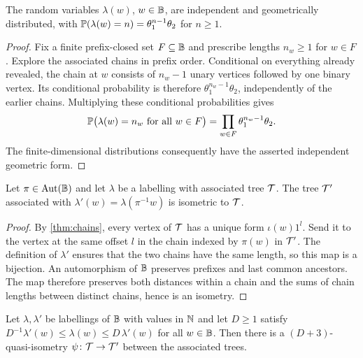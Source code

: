 \begin{lemma}
\label{thm:geometric}
\leanok
The random variables $\lambda(w)$, $w\in\mathbb{B}$, are independent and geometrically distributed,
with $\mathbb{P}(\lambda(w)=n)=\theta_1^{n-1}\theta_2$ for $n\geq1$.
\end{lemma}

\begin{proof}
\leanok
{}
Fix a finite prefix-closed set $F\subseteq\mathbb{B}$ and prescribe lengths $n_w\geq1$ for
$w\in F$. Explore the associated chains in prefix order. Conditional on everything already
revealed, the chain at $w$ consists of $n_w-1$ unary vertices followed by one binary vertex.
Its conditional probability is therefore $\theta_1^{n_w-1}\theta_2$, independently of the
earlier chains. Multiplying these conditional probabilities gives
\[
 \mathbb{P}\bigl(\lambda(w)=n_w\text{ for all }w\in F\bigr)
 =\prod_{w\in F}\theta_1^{n_w-1}\theta_2.
\]
The finite-dimensional distributions consequently have the asserted independent geometric
form.
\end{proof}

\begin{lemma}
\label{thm:isometry}
\leanok
Let $\pi\in\operatorname{Aut}(\mathbb{B})$ and let $\lambda$ be a labelling with associated tree $\mathcal{T}$. The tree
$\mathcal{T}'$ associated with $\lambda'(w)=\lambda(\pi^{-1}w)$ is isometric to $\mathcal{T}$.
\end{lemma}

\begin{proof}
\leanok
{}
By \cref{thm:chains}, every vertex of $\mathcal{T}$ has a unique form $\iota(w)1^l$. Send it to the
vertex at the same offset $l$ in the chain indexed by $\pi(w)$ in $\mathcal{T}'$. The definition of
$\lambda'$ ensures that the two chains have the same length, so this map is a bijection. An
automorphism of $\mathbb{B}$ preserves prefixes and last common ancestors. The map therefore preserves
both distances within a chain and the sums of chain lengths between distinct chains, hence is an
isometry.
\end{proof}

\begin{lemma}[Transfer]
\label{thm:transfer}
\leanok
{}
Let $\lambda,\lambda'$ be labellings of $\mathbb{B}$ with values in $\mathbb{N}$ and let $D\geq1$ satisfy
$D^{-1}\lambda'(w)\leq\lambda(w)\leq D\,\lambda'(w)$ for all $w\in\mathbb{B}$. Then there is a
$(D+3)$-quasi-isometry $\psi\colon\mathcal{T}\to\mathcal{T}'$ between the associated trees.
\end{lemma}

